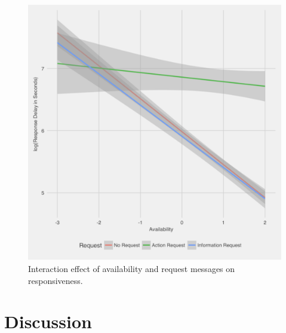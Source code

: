 \documentclass[12pt]{nuthesis}	%
\begin{document}
\begin{figure}[h]
\centering
\includegraphics[width=.7\textwidth]{figures/request_availability_interaction}
\caption{Interaction effect of availability and request messages on responsiveness.}
\label{fig:request_availability_interaction}
\end{figure}


\chapter{Discussion}

 \renewcommand\refname{\begin{centering}References\end{centering}}
 




\end{document}
